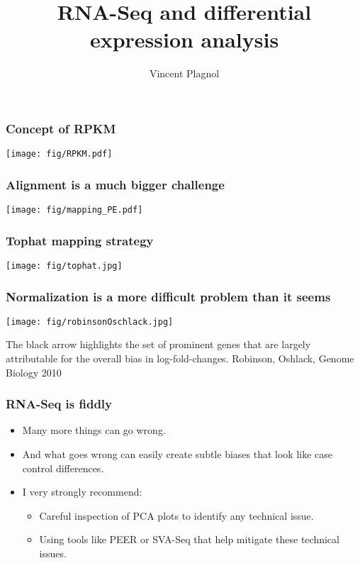 \documentclass{beamer}
\title{RNA-Seq and differential expression analysis}
\author[]{Vincent Plagnol}
\institute{UCL}
\date{}
\begin{document}
\maketitle







\begin{frame}
  \frametitle{Concept of RPKM}
  \begin{center}
    \texttt{[image: fig/RPKM.pdf]}
  \end{center}
\end{frame}


\begin{frame}
  \frametitle{Alignment is a much bigger challenge}
  \begin{center}
    \texttt{[image: fig/mapping\_PE.pdf]}
  \end{center}
\end{frame}

\begin{frame}
  \frametitle{Tophat mapping strategy}
  \begin{center}
    \texttt{[image: fig/tophat.jpg]}
  \end{center}
\end{frame}


\begin{frame}
  \frametitle{Normalization is a more difficult problem than it seems}
  \begin{center}
    \texttt{[image: fig/robinsonOschlack.jpg]}
  \end{center}
  The black arrow highlights the set of prominent genes that are largely attributable for the overall bias in log-fold-changes.
  \scriptsize{Robinson, Oshlack, Genome Biology 2010}
\end{frame}

\begin{frame}
  \frametitle{RNA-Seq is fiddly}
  \begin{itemize}
  \item Many more things can go wrong.
  \item And what goes wrong can easily create subtle biases that look like case control differences.
  \item I very strongly recommend:
    \begin{itemize}
    \item Careful inspection of PCA plots to identify any technical issue.
    \item Using tools like PEER or SVA-Seq that help mitigate these technical issues.
    \end{itemize}
  \end{itemize}
\end{frame}
\end{document}

